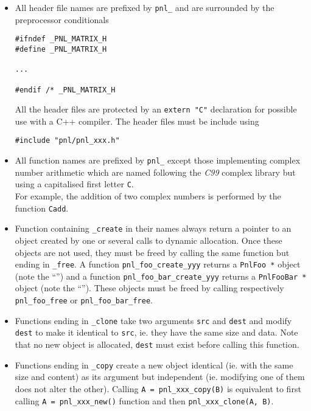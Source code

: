 \documentclass[a4paper,11pt,twoside]{article}
\newcommand{\ptr}{\textasteriskcentered}
\begin{document}
\begin{itemize}
  \item All header file names are prefixed by \verb!pnl_! and are surrounded by
    the preprocessor conditionals
\begin{verbatim}
#ifndef _PNL_MATRIX_H
#define _PNL_MATRIX_H

...

#endif /* _PNL_MATRIX_H
\end{verbatim}
All the header files are protected by an \verb!extern "C"! declaration for
possible use with a C++ compiler. The header files must be include using
\begin{verbatim}
#include "pnl/pnl_xxx.h"
\end{verbatim}

  \item All function names are prefixed by \verb!pnl_! except those implementing
    complex number arithmetic which are named following the \textit{C99}
    complex library but using a capitalised first letter \verb!C!. \\
    For example, the addition of two complex numbers is performed by the
    function \verb!Cadd!.

  \item Function containing \verb!_create! in their names always return a
    pointer to an object created by one or several calls to dynamic
    allocation. Once these objects are not used, they must be freed by calling
    the same function but ending in \verb!_free!.
    A function \verb!pnl_foo_create_yyy! returns a \verb!PnlFoo *! object (note
    the ``\ptr'') and a function \verb!pnl_foo_bar_create_yyy! returns a
    \verb!PnlFooBar *! object (note the ``\ptr'').
    These objects must be freed by calling respectively \verb!pnl_foo_free! or
    \verb!pnl_foo_bar_free!.

  \item Functions ending in \verb!_clone! take two arguments \verb!src! and
    \verb!dest! and modify \verb!dest! to make it identical to \verb!src!, ie.
    they have the same size and data. Note that no new object is allocated,
    \verb!dest! must exist before calling this function.

  \item Functions ending in \verb!_copy! create a new object identical (ie. with
    the same size and content) as its argument but independent (ie. modifying
    one of them does not alter the other). Calling \verb!A = pnl_xxx_copy(B)!
    is equivalent to first calling \verb!A = pnl_xxx_new()! function and then
    \verb!pnl_xxx_clone(A, B)!.
    

\end{itemize}
\end{document}
